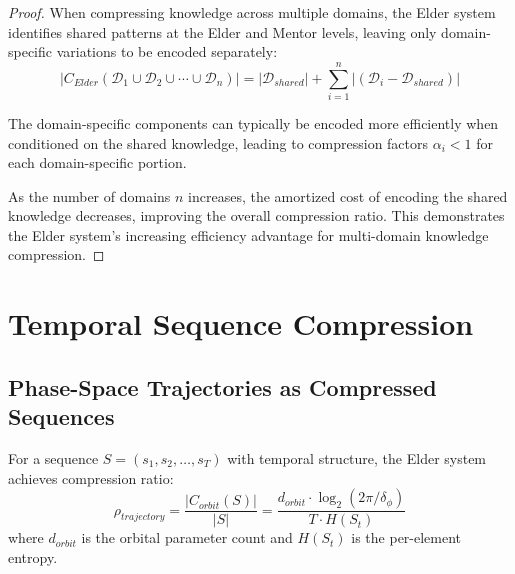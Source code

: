 \begin{proof}
When compressing knowledge across multiple domains, the Elder system identifies shared patterns at the Elder and Mentor levels, leaving only domain-specific variations to be encoded separately:
\begin{equation}
|C_{Elder}(\mathcal{D}_1 \cup \mathcal{D}_2 \cup \cdots \cup \mathcal{D}_n)| = |\mathcal{D}_{shared}| + \sum_{i=1}^n |(\mathcal{D}_i - \mathcal{D}_{shared})|
\end{equation}

The domain-specific components can typically be encoded more efficiently when conditioned on the shared knowledge, leading to compression factors $\alpha_i < 1$ for each domain-specific portion.

As the number of domains $n$ increases, the amortized cost of encoding the shared knowledge decreases, improving the overall compression ratio. This demonstrates the Elder system's increasing efficiency advantage for multi-domain knowledge compression.
\end{proof}

\section{Temporal Sequence Compression}

\subsection{Phase-Space Trajectories as Compressed Sequences}

\begin{theorem}
For a sequence $S = (s_1, s_2, \ldots, s_T)$ with temporal structure, the Elder system achieves compression ratio:
\begin{equation}
\rho_{trajectory} = \frac{|C_{orbit}(S)|}{|S|} = \frac{d_{orbit} \cdot \log_2(2\pi/\delta_{\phi})}{T \cdot H(S_t)}
\end{equation}
where $d_{orbit}$ is the orbital parameter count and $H(S_t)$ is the per-element entropy.
\end{theorem}

